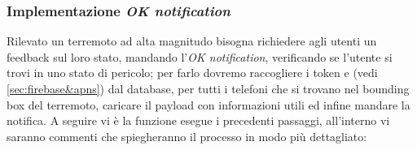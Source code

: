 \documentclass[main.tex]{subfiles}
\begin{document}

\subsubsection{Implementazione \emph{OK notification}}
Rilevato un terremoto ad alta magnitudo bisogna richiedere agli utenti un feedback sul loro stato, mandando l'\emph{OK notification}, verificando se l'utente si trovi in uno stato di pericolo; per farlo dovremo raccogliere i token  e  (vedi \ref{sec:firebase&apns}) dal database, per tutti i telefoni che si trovano nel bounding box del terremoto, caricare il payload con informazioni utili ed infine mandare la notifica.\newline
A seguire vi è la funzione esegue i precedenti passaggi, all'interno vi saranno commenti che spiegheranno il processo in modo più dettagliato:

\end{document}
